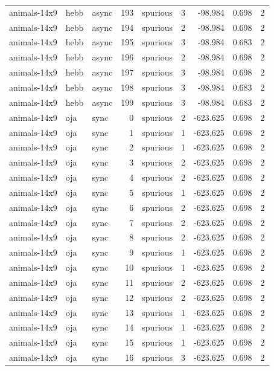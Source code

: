 \begin{tabular}{lllrlrrrr}
animals-14x9 & hebb & async & 193 & spurious & 3 & -98.984 & 0.698 & 2 \\
animals-14x9 & hebb & async & 194 & spurious & 2 & -98.984 & 0.698 & 2 \\
animals-14x9 & hebb & async & 195 & spurious & 3 & -98.984 & 0.683 & 2 \\
animals-14x9 & hebb & async & 196 & spurious & 2 & -98.984 & 0.698 & 2 \\
animals-14x9 & hebb & async & 197 & spurious & 3 & -98.984 & 0.698 & 2 \\
animals-14x9 & hebb & async & 198 & spurious & 3 & -98.984 & 0.683 & 2 \\
animals-14x9 & hebb & async & 199 & spurious & 3 & -98.984 & 0.683 & 2 \\
animals-14x9 & oja & sync & 0 & spurious & 2 & -623.625 & 0.698 & 2 \\
animals-14x9 & oja & sync & 1 & spurious & 1 & -623.625 & 0.698 & 2 \\
animals-14x9 & oja & sync & 2 & spurious & 1 & -623.625 & 0.698 & 2 \\
animals-14x9 & oja & sync & 3 & spurious & 2 & -623.625 & 0.698 & 2 \\
animals-14x9 & oja & sync & 4 & spurious & 2 & -623.625 & 0.698 & 2 \\
animals-14x9 & oja & sync & 5 & spurious & 1 & -623.625 & 0.698 & 2 \\
animals-14x9 & oja & sync & 6 & spurious & 2 & -623.625 & 0.698 & 2 \\
animals-14x9 & oja & sync & 7 & spurious & 2 & -623.625 & 0.698 & 2 \\
animals-14x9 & oja & sync & 8 & spurious & 2 & -623.625 & 0.698 & 2 \\
animals-14x9 & oja & sync & 9 & spurious & 1 & -623.625 & 0.698 & 2 \\
animals-14x9 & oja & sync & 10 & spurious & 1 & -623.625 & 0.698 & 2 \\
animals-14x9 & oja & sync & 11 & spurious & 2 & -623.625 & 0.698 & 2 \\
animals-14x9 & oja & sync & 12 & spurious & 2 & -623.625 & 0.698 & 2 \\
animals-14x9 & oja & sync & 13 & spurious & 1 & -623.625 & 0.698 & 2 \\
animals-14x9 & oja & sync & 14 & spurious & 1 & -623.625 & 0.698 & 2 \\
animals-14x9 & oja & sync & 15 & spurious & 1 & -623.625 & 0.698 & 2 \\
animals-14x9 & oja & sync & 16 & spurious & 3 & -623.625 & 0.698 & 2 \\

\end{tabular}

